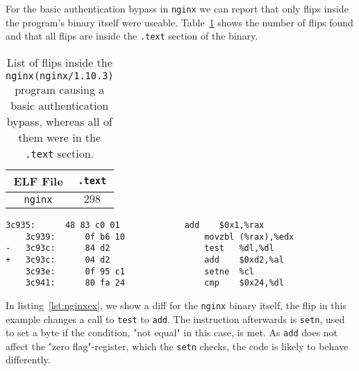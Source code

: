 For the basic authentication bypass in \texttt{nginx} we can report that only
flips inside the program's binary itself were useable. Table~\ref{tab:nginxres}
shows the number of flips found and that all flips are inside the \texttt{.text}
section of the binary.

\begin{table}[]
\centering
\begin{tabular}{c|c}
ELF File               & \texttt{.text} \\ \hline
\texttt{nginx}         & $298$
\end{tabular}
\caption{List of flips inside the \texttt{nginx(nginx/1.10.3)} program causing a
basic authentication bypass, whereas all of them were in the \texttt{.text}
section.}
\label{tab:nginxres}
\end{table}

\begin{minipage}{\linewidth}
\begin{lstlisting}[style=diff,
                   caption={Diff for a bitflip applied to the \texttt{nginx}
binary in order to bypass a credential check. The call to \texttt{test} is
replaced by \texttt{add} which doesn't chage a register the \texttt{setne}
instruction would check.},
label=lst:nginxex]
    3c935:      48 83 c0 01             add    $0x1,%rax
    3c939:      0f b6 10                movzbl (%rax),%edx
-   3c93c:      84 d2                   test   %dl,%dl
+   3c93c:      04 d2                   add    $0xd2,%al
    3c93e:      0f 95 c1                setne  %cl
    3c941:      80 fa 24                cmp    $0x24,%dl
\end{lstlisting}
\end{minipage}

In listing~\ref{lst:nginxex}, we show a diff for the \texttt{nginx} binary
itself, the flip in this example changes a call to \texttt{test} to
\texttt{add}. The instruction afterwards is \texttt{setn}, used to set a byte if
the condition, "not equal" in this case, is met. As \texttt{add} does not affect
the "zero flag"-register, which the \texttt{setn} checks, the code is likely to
behave differently.

